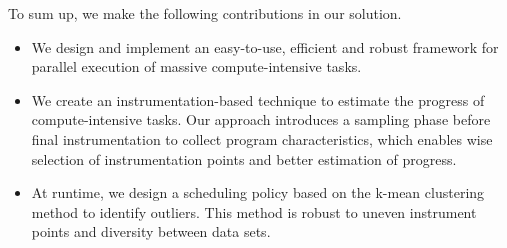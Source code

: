 To sum up, we make the following contributions in our solution. 
\begin{itemize}
\item We design and implement an easy-to-use, efficient and robust framework for parallel execution of massive compute-intensive tasks. 
\item We create an instrumentation-based technique to estimate the progress of compute-intensive tasks. Our approach introduces a sampling phase before final instrumentation to collect program characteristics, which enables wise selection of instrumentation points and better estimation of progress. 
\item At runtime, we design a scheduling policy based on the k-mean clustering method to identify outliers. This method is robust to uneven instrument points and diversity between data sets.
\end{itemize}

